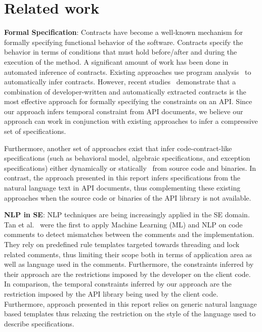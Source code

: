 \section{Related work}
\label{sec:related}


\textbf{Formal Specification}:
Contracts have become a well-known mechanism for formally specifying functional behavior of the software. 
Contracts specify the behavior in terms of conditions that must hold before/after and during the execution of the method.
A significant amount of work has been done in automated inference of contracts.
Existing approaches use program analysis~\cite{csallner08dysy,NimmerE02:ISSTA,Tillmann:2006:DLM:2105385.2105433}
to automatically infer contracts.
However, recent studies~\cite{Polikarpova2009ISSTA,Flanagan2001:HAA} demonstrate that a combination of developer-written and automatically extracted
contracts is the most effective approach for formally specifying the constraints on an API.
Since  our approach infers temporal constraint from API documents, we believe our approach can work in conjunction with existing approaches
to infer a compressive set of specifications.
  
Furthermore, another set of approaches exist that infer code-contract-like specifications (such as behavioral model, algebraic specifications, and exception specifications) either dynamically\cite{Henkel07discoveringdocumentation,Ghezzi:2009:SIB:1555001.1555057,Henkel:2008:DDA:1363102.1363105} or statically~\cite{Flanagan2001:HAA,Buse:2008:ADI:1390630.1390664} from source code and binaries. In contrast, the approach presented in this report infers specifications from the natural language text in API documents,
thus complementing these existing approaches when the source code or binaries of the API library is not available.


\textbf{NLP in SE}:
NLP techniques are being increasingly applied in the SE domain. 
Tan et al.~\cite{TanSOSP07} were the first to apply Machine Learning (ML) and NLP on code comments to detect mismatches between the comments and the implementation.
They rely on predefined rule templates targeted towards threading and lock related comments, thus limiting their scope both in terms of application area as well as language used in the comments.
Furthermore, the constraints inferred by their approach are the restrictions imposed by the developer on the client code.
In comparison, the temporal constraints inferred by our approach are the restriction imposed by the API library being used by the client code.
Furthermore, approach presented in this report relies on generic natural language based templates thus relaxing the restriction on the style of the language used to describe specifications.


